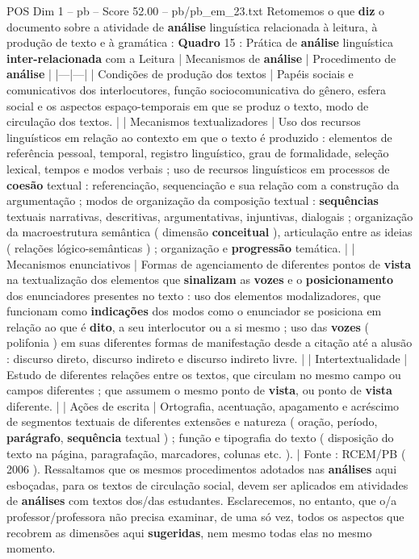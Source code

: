\begin{textsample}{POS Dim 1 – pb – Score 52.00 – pb/pb\_em\_23.txt}
Retomemos o que \textbf{diz} o documento sobre a atividade de \textbf{análise} linguística relacionada à leitura, à produção de texto e à gramática : \textbf{Quadro} 15 : Prática de \textbf{análise} linguística \textbf{inter-relacionada} com a Leitura | Mecanismos de \textbf{análise} | Procedimento de \textbf{análise} | |---|---| | Condições de produção dos textos | Papéis sociais e comunicativos dos interlocutores, função sociocomunicativa do gênero, esfera social e os aspectos espaço-temporais em que se produz o texto, modo de circulação dos textos. | | Mecanismos textualizadores | Uso dos recursos linguísticos em relação ao contexto em que o texto é produzido : elementos de referência pessoal, temporal, registro linguístico, grau de formalidade, seleção lexical, tempos e modos verbais ; uso de recursos linguísticos em processos de \textbf{coesão} textual : referenciação, sequenciação e sua relação com a construção da argumentação ; modos de organização da composição textual : \textbf{sequências} textuais narrativas, descritivas, argumentativas, injuntivas, dialogais ; organização da macroestrutura semântica ( dimensão \textbf{conceitual} ), articulação entre as ideias ( relações lógico-semânticas ) ; organização e \textbf{progressão} temática. | | Mecanismos enunciativos | Formas de agenciamento de diferentes pontos de \textbf{vista} na textualização dos elementos que \textbf{sinalizam} as \textbf{vozes} e o \textbf{posicionamento} dos enunciadores presentes no texto : uso dos elementos modalizadores, que funcionam como \textbf{indicações} dos modos como o enunciador se posiciona em relação ao que é \textbf{dito}, a seu interlocutor ou a si mesmo ; uso das \textbf{vozes} ( polifonia ) em suas diferentes formas de manifestação desde a citação até a alusão : discurso direto, discurso indireto e discurso indireto livre. | | Intertextualidade | Estudo de diferentes relações entre os textos, que circulam no mesmo campo ou campos diferentes ; que assumem o mesmo ponto de \textbf{vista}, ou ponto de \textbf{vista} diferente. | | Ações de escrita | Ortografia, acentuação, apagamento e acréscimo de segmentos textuais de diferentes extensões e natureza ( oração, período, \textbf{parágrafo}, \textbf{sequência} textual ) ; função e tipografia do texto ( disposição do texto na página, paragrafação, marcadores, colunas etc. ). | Fonte : RCEM/PB ( 2006 ).
Ressaltamos que os mesmos procedimentos adotados nas \textbf{análises} aqui esboçadas, para os textos de circulação social, devem ser aplicados em atividades de \textbf{análises} com textos dos/das estudantes.
Esclarecemos, no entanto, que o/a professor/professora não precisa examinar, de uma só vez, todos os aspectos que recobrem as dimensões aqui \textbf{sugeridas}, nem mesmo todas elas no mesmo momento.

\end{textsample}
